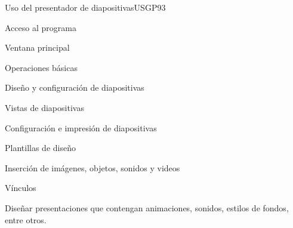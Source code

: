 \begin{syllabus}
\begin{unit}{Uso del presentador de diapositivas}{USGP}{9}{3}
\begin{topics}
      \item Acceso al programa
      \item Ventana principal
      \item Operaciones básicas
      \item Diseño y configuración de diapositivas
      \item Vistas de diapositivas
      \item Configuración e impresión de diapositivas
      \item Plantillas de diseño 
      \item Inserción de imágenes, objetos, sonidos y videos
      \item Vínculos
\end{topics}
\begin{unitgoals}
   \item Diseñar presentaciones que contengan animaciones, sonidos, estilos de fondos, entre otros.
\end{unitgoals}
\end{unit}

\begin{coursebibliography}

\end{coursebibliography}

\end{syllabus}
